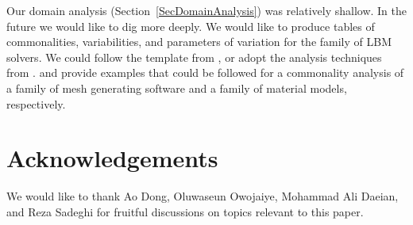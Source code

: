 \documentclass[final, 3p, times, authoryear]{elsarticle}
\begin{document}
Our domain analysis (Section~\ref{SecDomainAnalysis}) was relatively shallow.  In
the future we would like to dig more deeply.  We would like to produce tables of
commonalities, variabilities, and parameters of variation for the family of LBM
solvers. We could follow the template from \citet{smith2008commonality}, or
adopt the analysis techniques from \citet{weiss1998commonality}.
\citet{SmithAndChen2004} and \citet{SmithMcCutchanAndCarette2017} provide
examples that could be followed for a commonality analysis of a family of mesh
generating software and a family of material models, respectively.

\section*{Acknowledgements}

We would like to thank Ao Dong, Oluwaseun Owojaiye, Mohammad Ali Daeian, and Reza
Sadeghi for fruitful discussions on topics relevant to this paper.



\end{document}

